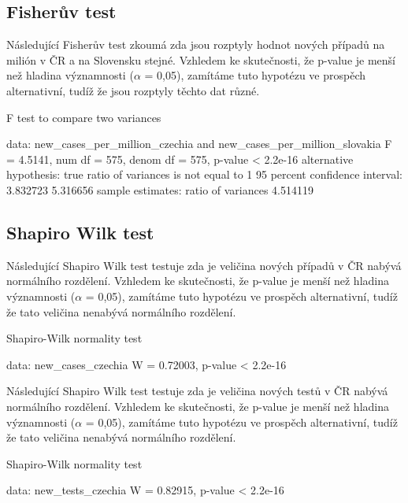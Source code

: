 \documentclass[a4paper, 12pt]{article}
\begin{document}
\clearpage

\subsection{Fisherův test}

Následující Fisherův test zkoumá zda jsou rozptyly hodnot nových případů na milión
v ČR a na Slovensku stejné. Vzhledem ke skutečnosti, že p-value je menší
než hladina významnosti ($\alpha$ = 0,05), zamítáme tuto hypotézu ve prospěch alternativní,
tudíž že jsou rozptyly těchto dat různé.

\begin{Schunk}
\begin{Soutput}
	F test to compare two variances

data:  new_cases_per_million_czechia and new_cases_per_million_slovakia
F = 4.5141, num df = 575, denom df = 575, p-value < 2.2e-16
alternative hypothesis: true ratio of variances is not equal to 1
95 percent confidence interval:
 3.832723 5.316656
sample estimates:
ratio of variances 
          4.514119 
\end{Soutput}
\end{Schunk}

\subsection{Shapiro Wilk test}

Následující Shapiro Wilk test testuje zda je veličina nových případů v ČR nabývá
normálního rozdělení. Vzhledem ke skutečnosti, že p-value je menší
než hladina významnosti ($\alpha$ = 0,05), zamítáme tuto hypotézu ve prospěch alternativní,
tudíž že tato veličina nenabývá normálního rozdělení.

\begin{Schunk}
\begin{Soutput}
	Shapiro-Wilk normality test

data:  new_cases_czechia
W = 0.72003, p-value < 2.2e-16
\end{Soutput}
\end{Schunk}

\clearpage

Následující Shapiro Wilk test testuje zda je veličina nových testů v ČR nabývá
normálního rozdělení. Vzhledem ke skutečnosti, že p-value je menší
než hladina významnosti ($\alpha$ = 0,05), zamítáme tuto hypotézu ve prospěch alternativní,
tudíž že tato veličina nenabývá normálního rozdělení.

\begin{Schunk}
\begin{Soutput}
	Shapiro-Wilk normality test

data:  new_tests_czechia
W = 0.82915, p-value < 2.2e-16
\end{Soutput}
\end{Schunk}
\end{document}
